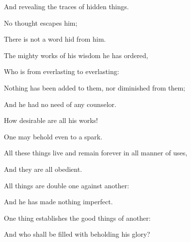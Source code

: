 {\par }{\Q And revealing the traces of hidden things.
\par }{\Q {}No thought escapes him;
\par }{\Q There is not a word hid from him.
\par }{\Q {}The mighty works of his wisdom he has ordered,
\par }{\Q Who is from everlasting to everlasting:
\par }{\Q Nothing has been added to them, nor diminished from them;
\par }{\Q And he had no need of any counselor.
\par }{\Q {}How desirable are all his works!
\par }{\Q One may behold
{} even to a spark.
\par }{\Q {}All these things live and remain forever in all manner of uses,
\par }{\Q And they are all obedient.
\par }{\Q {}All things are double one against another:
\par }{\Q And he has made nothing imperfect.
\par }{\Q {}One thing establishes the good things of another:
\par }{\Q And who shall be filled with beholding his glory?
\par }{\BB \par }
